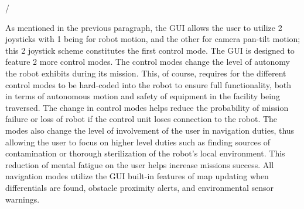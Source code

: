 /%

As mentioned in the previous paragraph, the GUI allows the user to utilize 2 joysticks with 1 being for robot motion, and the other for camera pan-tilt motion; this 2 joystick scheme constitutes the first control mode. The GUI is designed to feature 2 more control modes. The control modes change the level of autonomy the robot exhibits during its mission. This, of course, requires for the different control modes to be hard-coded into the robot to ensure full functionality, both in terms of autonomous motion and safety of equipment in the facility being traversed. The change in control modes helps reduce the probability of mission failure or loss of robot if the control unit loses connection to the robot. The modes also change the level of involvement of the user in navigation duties, thus allowing the user to focus on higher level duties such as finding sources of contamination or thorough sterilization of the robot's local environment. This reduction of mental fatigue on the user helps increase missions success. All navigation modes utilize the GUI built-in features of map updating when differentials are found, obstacle proximity alerts, and environmental sensor warnings. 

